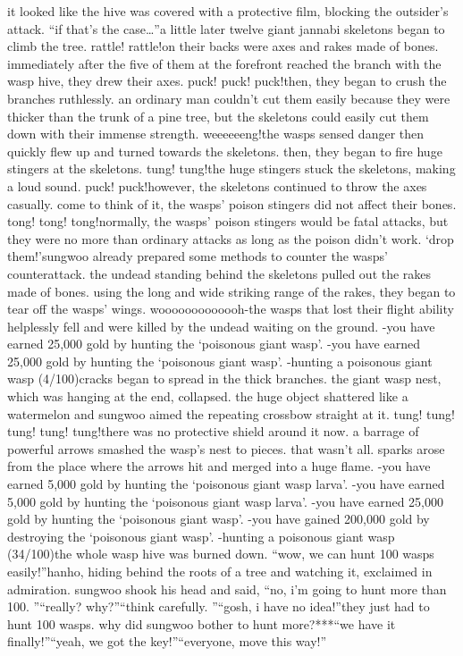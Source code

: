 it looked like the hive was covered with a protective film, blocking the outsider’s attack.
“if that’s the case…”a little later twelve giant jannabi skeletons began to climb the tree.
rattle! rattle!on their backs were axes and rakes made of bones.
immediately after the five of them at the forefront reached the branch with the wasp hive, they drew their axes.
puck! puck! puck!then, they began to crush the branches ruthlessly.
 an ordinary man couldn’t cut them easily because they were thicker than the trunk of a pine tree, but the skeletons could easily cut them down with their immense strength.
weeeeeeng!the wasps sensed danger then quickly flew up and turned towards the skeletons.
then, they began to fire huge stingers at the skeletons.
tung! tung!the huge stingers stuck the skeletons, making a loud sound.
puck! puck!however, the skeletons continued to throw the axes casually.
 come to think of it, the wasps’ poison stingers did not affect their bones.
tong! tong! tong!normally, the wasps’ poison stingers would be fatal attacks, but they were no more than ordinary attacks as long as the poison didn’t work.
‘drop them!’sungwoo already prepared some methods to counter the wasps’ counterattack.
the undead standing behind the skeletons pulled out the rakes made of bones.
using the long and wide striking range of the rakes, they began to tear off the wasps’ wings.
wooooooooooooh-the wasps that lost their flight ability helplessly fell and were killed by the undead waiting on the ground.
-you have earned 25,000 gold by hunting the ‘poisonous giant wasp’.
-you have earned 25,000 gold by hunting the ‘poisonous giant wasp’.
-hunting a poisonous giant wasp (4/100)cracks began to spread in the thick branches.
the giant wasp nest, which was hanging at the end, collapsed.
the huge object shattered like a watermelon and sungwoo aimed the repeating crossbow straight at it.
tung! tung! tung! tung! tung!there was no protective shield around it now.
 a barrage of powerful arrows smashed the wasp’s nest to pieces.
that wasn’t all.
 sparks arose from the place where the arrows hit and merged into a huge flame.
-you have earned 5,000 gold by hunting the ‘poisonous giant wasp larva’.
-you have earned 5,000 gold by hunting the ‘poisonous giant wasp larva’.
-you have earned 25,000 gold by hunting the ‘poisonous giant wasp’.
-you have gained 200,000 gold by destroying the ‘poisonous giant wasp’.
-hunting a poisonous giant wasp (34/100)the whole wasp hive was burned down.
“wow, we can hunt 100 wasps easily!”hanho, hiding behind the roots of a tree and watching it, exclaimed in admiration.
sungwoo shook his head and said, “no, i’m going to hunt more than 100.
”“really? why?”“think carefully.
”“gosh, i have no idea!”they just had to hunt 100 wasps.
 why did sungwoo bother to hunt more?***“we have it finally!”“yeah, we got the key!”“everyone, move this way!”

